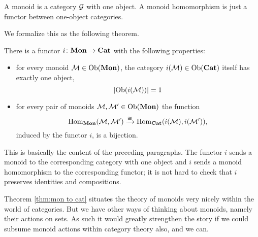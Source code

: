\documentclass[CT4S-EN-RU]{subfiles}
\begin{document}
\begin{blockRUS}
\end{blockRUS}

\begin{sloganENG}
A monoid is a category $\mathcal{G}$ with one object. A monoid homomorphism is just a functor between one-object categories.
\end{sloganENG}

\begin{sloganRUS}
\end{sloganRUS}

\begin{blockENG}
We formalize this as the following theorem.
\end{blockENG}

\begin{blockRUS}
\end{blockRUS}

\begin{theoremENG}\label{thm:mon to cat}
There is a functor $i\colon{\mathbf{Mon}}\rightarrow{\mathbf{Cat}}$ with the following properties:
\begin{itemize}
\item for every monoid $\mathcal{M}\in\textnormal{Ob}({\mathbf{Mon}})$, the category $i(\mathcal{M})\in\textnormal{Ob}({\mathbf{Cat}})$ itself has exactly one object, $$|\textnormal{Ob}(i(\mathcal{M}))|=1$$ 
\item for every pair of monoids $\mathcal{M},\mathcal{M}'\in\textnormal{Ob}({\mathbf{Mon}})$ the function $$\textnormal{Hom}_{\mathbf{Mon}}(\mathcal{M},\mathcal{M}')\xrightarrow{\cong}\textnormal{Hom}_{\mathbf{Cat}}(i(\mathcal{M}),i(\mathcal{M}')),$$ induced by the functor $i$, is a bijection.
\end{itemize}
\end{theoremENG}

\begin{theoremRUS}\label{thm:mon to cat}
\end{theoremRUS}

\begin{proofENG}
This is basically the content of the preceding paragraphs. The functor $i$ sends a monoid to the corresponding category with one object and $i$ sends a monoid homomorphism to the corresponding functor; it is not hard to check that $i$ preserves identities and compositions.
\end{proofENG}

\begin{proofRUS}
\end{proofRUS}

\begin{blockENG}
Theorem \ref{thm:mon to cat} situates the theory of monoids very nicely within the world of categories. But we have other ways of thinking about monoids, namely their actions on sets. As such it would greatly strengthen the story if we could subsume monoid actions within category theory also, and we can.
\end{blockENG}
\end{document}
